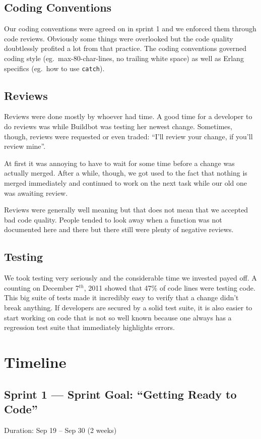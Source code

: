 \documentclass[11pt,a4paper]{report}
\begin{document}
\subsection*{Coding Conventions}
Our coding conventions were agreed on in sprint 1 and we enforced them through
code reviews. Obviously some things were overlooked but the code quality
doubtlessly profited a lot from that practice.
The coding conventions governed coding style (eg.\ max-80-char-lines, no
trailing white space) as well as Erlang specifics (eg.\ how to use {\tt catch}).
\subsection*{Reviews}
Reviews were done mostly by whoever had time. A good time for a developer to do
reviews was while Buildbot was testing her newest change. Sometimes, though,
reviews were requested or even traded: ``I'll review your change, if you'll
review mine''.

At first it was annoying to have to wait for some time before a change was
actually merged. After a while, though, we got used to the fact that nothing is
merged immediately and continued to work on the next task while our old one was
awaiting review.

Reviews were generally well meaning but that does not mean that we accepted bad
code quality. People tended to look away when a function was not documented here
and there but there still were plenty of negative reviews.
\subsection*{Testing}
We took testing very seriously and the considerable time we invested payed off.
A counting on December 7$^{th}$, 2011 showed that 47\% of code lines were
testing code. This big suite of tests made it incredibly easy to verify that a
change didn't break anything. If developers are secured by a solid test suite,
it is also easier to start working on code that is not so well known because one
always has a regression test suite that immediately highlights errors.

\section{Timeline}
\subsection*{Sprint 1 --- Sprint Goal: ``Getting Ready to Code''}
Duration: Sep 19 -- Sep 30 (2 weeks)
\end{document}

